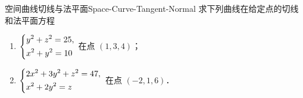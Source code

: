 \begin{problem}{空间曲线切线与法平面}{Space-Curve-Tangent-Normal}
    求下列曲线在给定点的切线和法平面方程
    \begin{enumerate}
        \item $\begin{dcases} y^2 + z^2 = 25, \\ x^2 + y^2 = 10 \end{dcases}$ 在点 $(1, 3, 4)$；
        \item $\begin{dcases} 2x^2 + 3y^2 + z^2 = 47, \\ x^2 + 2y^2 = z \end{dcases}$ 在点 $(-2, 1, 6)$．
    \end{enumerate}
\end{problem}

